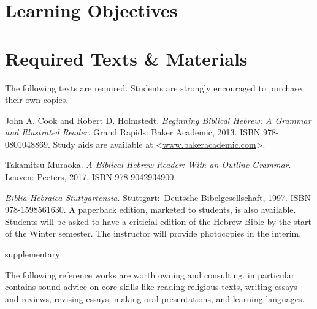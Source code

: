 \documentclass[titlepage]{article}
\newcommand\incl{../includes}
\begin{document}


  \section{Learning Objectives}
  \label{objectives}

  \edobject

\section{Required Texts \& Materials}
\label{texts}

The following texts are required. Students are strongly encouraged to
purchase their own copies.

\begingroup
\renewcommand{\section}[2]{}%
\begin{thebibliography}{NRSV}%

    John A. Cook and Robert D. Holmstedt.
    \emph{Beginning Biblical Hebrew: A Grammar and Illustrated Reader}.
    Grand Rapids: Baker Academic, 2013. ISBN 978-0801048869. Study aids are available at
    <\href{http://www.bakerpublishinggroup.com/books/beginning-biblical-hebrew/5629/students/esources}{www.bakeracademic.com}>.

    Takamitsu Muraoka.
    \emph{A Biblical Hebrew Reader: With an Outline Grammar}.
    Leuven: Peeters, 2017. ISBN 978-9042934900.

    \emph{Biblia Hebraica Stuttgartensia}.
    Stuttgart: Deutsche Bibel\-ge\-sell\-schaft, 1997. ISBN 978-1598561630.
    A paperback edition, marketed to students, is also available.
    Students will be asked to have a criticial edition of the Hebrew
    Bible by the start of the Winter semester. The instructor will
    provide photocopies in the interim.

\end{thebibliography}
\endgroup

\section{Supplementary Texts}
\label{supplementary}

The following reference works are worth owning and consulting.
\cite{rlgs} in particular contains sound advice on core skills like
reading religious texts, writing essays and reviews, revising essays,
making oral presentations, and learning languages.
\end{document}
